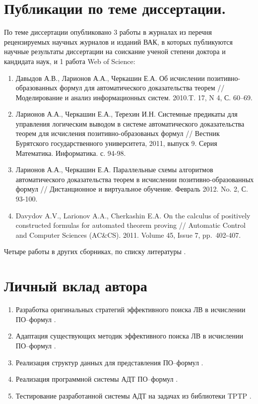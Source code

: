 \section*{Публикации по теме диссертации.} По теме диссертации опубликовано 3 работы в журналах из перечня рецензируемых научных журналов и изданий ВАК, в которых публикуются научные результаты диссертации на соискание ученой степени доктора и кандидата наук, и 1 работа Web of Science:
\begin{enumerate}
\item Давыдов А.В., Ларионов А.А., Черкашин Е.А. Об исчислении позитивно-образованных формул для автоматического доказательства теорем // Моделирование и анализ информационных систем. 2010.T. 17, N 4, С. 60--69.
\item Ларионов А.А., Черкашин Е.А., Терехин И.Н. Системные предикаты для управления логическим выводом в системе автоматического доказательства теорем для исчисления позитивно-образованых формул // Вестник Бурятского государственного университета, 2011, выпуск 9. Серия Математика. Информатика. с. 94-98.
\item Ларионов А.А., Черкашин Е.А. Параллельные схемы алгоритмов автоматического доказательства теорем в исчислении
позитивно-образованных формул // Дистанционное и виртуальное обучение. Февраль 2012. No. 2, С. 93-100.
\item Davydov A.V., Larionov A.A., Cherkashin E.A. On the calculus of positively constructed formulas for automated theorem proving // Automatic Control and Computer Sciences (AC\&CS). 2011. Volume 45, Issue 7, pp.~402-407.
\end{enumerate}

Четыре работы в других сборниках, по списку литературы \cite{viner, QUANT4, mipro, semver}.



\section*{Личный вклад автора}
\begin{enumerate}
\item Разработка оригинальных стратегий эффективного поиска ЛВ в исчислении ПО--формул \cite{mais, burvestm, viner, QUANT4, mipro}.
\item Адаптация существующих методик эффективного поиска ЛВ в исчислении ПО--формул \cite{mais, parallel, viner, mipro}.
\item Реализация структур данных для представления ПО--формул \cite{mais, viner, mipro, QUANT4}.
\item Реализация программной системы АДТ ПО--формул \cite{parallel, burvest, viner, miprom QUANT4}.
\item Тестирование разработанной системы АДТ на задачах из библиотеки TPTP \cite{parallel, viner, mipro}.
\end{enumerate}

